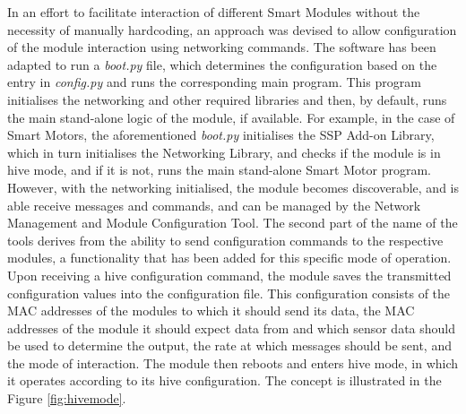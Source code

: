 \begin{itemize}
    In an effort to facilitate interaction of different Smart Modules without the necessity of manually hardcoding, an approach was devised to allow configuration of the module interaction using networking commands. The software has been adapted to run a \textit{boot.py} file, which determines the configuration based on the entry in \textit{config.py} and runs the corresponding main program. This program initialises the networking and other required libraries and then, by default, runs the main stand-alone logic of the module, if available. For example, in the case of Smart Motors, the aforementioned \textit{boot.py} initialises the SSP Add-on Library, which in turn initialises the Networking Library, and checks if the module is in hive mode, and if it is not, runs the main stand-alone Smart Motor program. However, with the networking initialised, the module becomes discoverable, and is able receive messages and commands, and can be managed by the Network Management and Module Configuration Tool. The second part of the name of the tools derives from the ability to send configuration commands to the respective modules, a functionality that has been added for this specific mode of operation. Upon receiving a hive configuration command, the module saves the transmitted configuration values into the configuration file. This configuration consists of the MAC addresses of the modules to which it should send its data, the MAC addresses of the module it should expect data from and which sensor data should be used to determine the output, the rate at which messages should be sent, and the mode of interaction. The module then reboots and enters hive mode, in which it operates according to its hive configuration. The concept is illustrated in the Figure \ref{fig:hivemode}.
\end{itemize}

